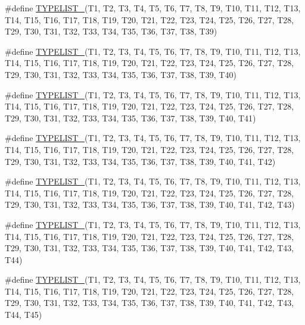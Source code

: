 \begin{DoxyCompactItemize}
\item 
\#define \mbox{\hyperlink{adat-devel_2lib_2adat_2typelist_8h_aa9a99682cd0587523cfb0993d86c1e2c}{T\+Y\+P\+E\+L\+I\+S\+T\+\_}}(T1,  T2,  T3,  T4,  T5,  T6,  T7,  T8,  T9,  T10,  T11,  T12,  T13,  T14,  T15,  T16,  T17,  T18,  T19,  T20,  T21,  T22,  T23,  T24,  T25,  T26,  T27,  T28,  T29,  T30,  T31,  T32,  T33,  T34,  T35,  T36,  T37,  T38,  T39)
\item 
\#define \mbox{\hyperlink{adat-devel_2lib_2adat_2typelist_8h_ab7b7d62f19ccf06ee454929d56ffd322}{T\+Y\+P\+E\+L\+I\+S\+T\+\_}}(T1,  T2,  T3,  T4,  T5,  T6,  T7,  T8,  T9,  T10,  T11,  T12,  T13,  T14,  T15,  T16,  T17,  T18,  T19,  T20,  T21,  T22,  T23,  T24,  T25,  T26,  T27,  T28,  T29,  T30,  T31,  T32,  T33,  T34,  T35,  T36,  T37,  T38,  T39,  T40)
\item 
\#define \mbox{\hyperlink{adat-devel_2lib_2adat_2typelist_8h_a4e73d03b07e0ab8468d525d9b0aeb864}{T\+Y\+P\+E\+L\+I\+S\+T\+\_}}(T1,  T2,  T3,  T4,  T5,  T6,  T7,  T8,  T9,  T10,  T11,  T12,  T13,  T14,  T15,  T16,  T17,  T18,  T19,  T20,  T21,  T22,  T23,  T24,  T25,  T26,  T27,  T28,  T29,  T30,  T31,  T32,  T33,  T34,  T35,  T36,  T37,  T38,  T39,  T40,  T41)
\item 
\#define \mbox{\hyperlink{adat-devel_2lib_2adat_2typelist_8h_a09c42eccbdc2469129e78523ea49406f}{T\+Y\+P\+E\+L\+I\+S\+T\+\_}}(T1,  T2,  T3,  T4,  T5,  T6,  T7,  T8,  T9,  T10,  T11,  T12,  T13,  T14,  T15,  T16,  T17,  T18,  T19,  T20,  T21,  T22,  T23,  T24,  T25,  T26,  T27,  T28,  T29,  T30,  T31,  T32,  T33,  T34,  T35,  T36,  T37,  T38,  T39,  T40,  T41,  T42)
\item 
\#define \mbox{\hyperlink{adat-devel_2lib_2adat_2typelist_8h_a2f4d47946978dfea8bf6e962ef0db4e5}{T\+Y\+P\+E\+L\+I\+S\+T\+\_}}(T1,  T2,  T3,  T4,  T5,  T6,  T7,  T8,  T9,  T10,  T11,  T12,  T13,  T14,  T15,  T16,  T17,  T18,  T19,  T20,  T21,  T22,  T23,  T24,  T25,  T26,  T27,  T28,  T29,  T30,  T31,  T32,  T33,  T34,  T35,  T36,  T37,  T38,  T39,  T40,  T41,  T42,  T43)
\item 
\#define \mbox{\hyperlink{adat-devel_2lib_2adat_2typelist_8h_a768c70cceb049b958e138c34898017f1}{T\+Y\+P\+E\+L\+I\+S\+T\+\_}}(T1,  T2,  T3,  T4,  T5,  T6,  T7,  T8,  T9,  T10,  T11,  T12,  T13,  T14,  T15,  T16,  T17,  T18,  T19,  T20,  T21,  T22,  T23,  T24,  T25,  T26,  T27,  T28,  T29,  T30,  T31,  T32,  T33,  T34,  T35,  T36,  T37,  T38,  T39,  T40,  T41,  T42,  T43,  T44)
\item 
\#define \mbox{\hyperlink{adat-devel_2lib_2adat_2typelist_8h_ab7a6f06aa68f9ec3bc513d5e1ce33e70}{T\+Y\+P\+E\+L\+I\+S\+T\+\_}}(T1,  T2,  T3,  T4,  T5,  T6,  T7,  T8,  T9,  T10,  T11,  T12,  T13,  T14,  T15,  T16,  T17,  T18,  T19,  T20,  T21,  T22,  T23,  T24,  T25,  T26,  T27,  T28,  T29,  T30,  T31,  T32,  T33,  T34,  T35,  T36,  T37,  T38,  T39,  T40,  T41,  T42,  T43,  T44,  T45)

\end{DoxyCompactItemize}
